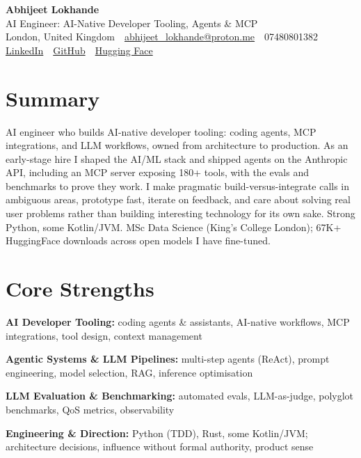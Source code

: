\documentclass[10pt,a4paper]{article}
\newcommand{\sep}{\,\textcolor{accent!60}{\textbar}\,}
\begin{document}
\begin{center}
  {\fontsize{24}{26}\selectfont\bfseries Abhijeet Lokhande}\\[3pt]
  {\color{accent}\large AI Engineer: AI-Native Developer Tooling, Agents \& MCP}\\[5pt]
  {\small
    London, United Kingdom \sep
    \href{mailto:abhijeet_lokhande@proton.me}{abhijeet\_lokhande@proton.me} \sep
    07480801382 \\[2pt]
    \href{https://www.linkedin.com/in/ablds/}{LinkedIn} \sep
    \href{https://github.com/abhijeetscode}{GitHub} \sep
    \href{https://huggingface.co/ab-ai}{Hugging Face}
  }
\end{center}
\vspace{2pt}

\section{Summary}
AI engineer who builds AI-native developer tooling: coding agents, MCP integrations, and LLM workflows, owned from architecture to production. As an early-stage hire I shaped the AI/ML stack and shipped agents on the Anthropic API, including an MCP server exposing 180+ tools, with the evals and benchmarks to prove they work. I make pragmatic build-versus-integrate calls in ambiguous areas, prototype fast, iterate on feedback, and care about solving real user problems rather than building interesting technology for its own sake. Strong Python, some Kotlin/JVM. MSc Data Science (King's College London); 67K+ HuggingFace downloads across open models I have fine-tuned.

\section{Core Strengths}
\begin{tight}
  \item[\textcolor{accent}{\small$\bullet$}] \textbf{AI Developer Tooling:} coding agents \& assistants, AI-native workflows, MCP integrations, tool design, context management
  \item[\textcolor{accent}{\small$\bullet$}] \textbf{Agentic Systems \& LLM Pipelines:} multi-step agents (ReAct), prompt engineering, model selection, RAG, inference optimisation
  \item[\textcolor{accent}{\small$\bullet$}] \textbf{LLM Evaluation \& Benchmarking:} automated evals, LLM-as-judge, polyglot benchmarks, QoS metrics, observability
  \item[\textcolor{accent}{\small$\bullet$}] \textbf{Engineering \& Direction:} Python (TDD), Rust, some Kotlin/JVM; architecture decisions, influence without formal authority, product sense
\end{tight}
\end{document}
